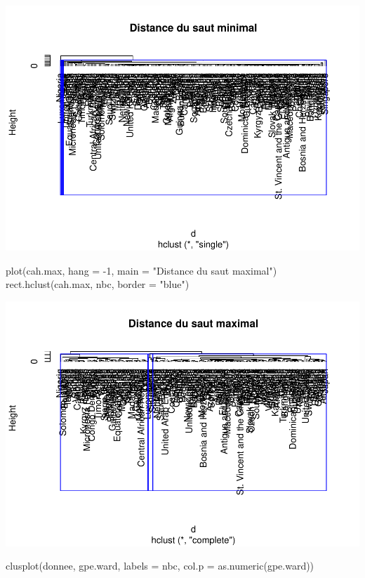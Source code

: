 \documentclass[
]{article}
\newenvironment{Shaded}{}{}
\newcommand{\AttributeTok}[1]{#1}
\newcommand{\DecValTok}[1]{#1}
\newcommand{\FunctionTok}[1]{#1}
\newcommand{\NormalTok}[1]{#1}
\newcommand{\SpecialCharTok}[1]{\textcolor[rgb]{0.00,0.50,0.50}{#1}}
\newcommand{\StringTok}[1]{\textcolor[rgb]{0.00,0.50,0.50}{#1}}
\begin{document}
\includegraphics{Projet_files/figure-latex/unnamed-chunk-21-1.pdf}

\begin{Shaded}
\begin{Highlighting}[]
\FunctionTok{plot}\NormalTok{(cah.max, }\AttributeTok{hang =} \SpecialCharTok{{-}}\DecValTok{1}\NormalTok{, }\AttributeTok{main =} \StringTok{"Distance du saut maximal"}\NormalTok{)}
\FunctionTok{rect.hclust}\NormalTok{(cah.max, nbc, }\AttributeTok{border =} \StringTok{"blue"}\NormalTok{)}
\end{Highlighting}
\end{Shaded}

\includegraphics{Projet_files/figure-latex/unnamed-chunk-22-1.pdf}

\begin{Shaded}
\begin{Highlighting}[]
\FunctionTok{clusplot}\NormalTok{(donnee, gpe.ward, }\AttributeTok{labels =}\NormalTok{ nbc, }\AttributeTok{col.p =} \FunctionTok{as.numeric}\NormalTok{(gpe.ward))}
\end{Highlighting}
\end{Shaded}
\end{document}
